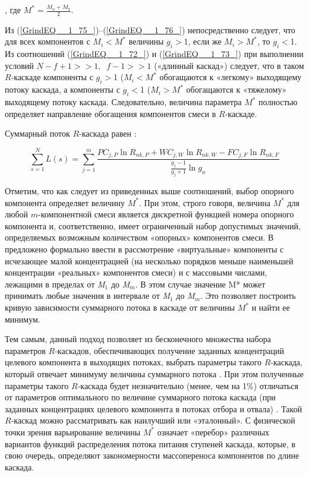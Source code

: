 , где $M^{*} =\frac{M_{n} +M_{k} }{2} $.

Из (\ref{GrindEQ__1_75_})--(\ref{GrindEQ__1_76_}) непосредственно следует, что для всех компонентов с $M_{i} $$\mathrm{<}$$M^{*} $ величины $g_{i} $$\mathrm{>}$1, если же $M_{i} $$\mathrm{>}$$M^{*} $, то $g_{i} $$\mathrm{<}$1. Из соотношений (\ref{GrindEQ__1_72_}) и (\ref{GrindEQ__1_73_}) при выполнении условий $N-f+1>>1,\; \; f-1>>1$ («длинный каскад») следует, что в таком $R$-каскаде компоненты с $g_{i} $$\mathrm{>}$1 ($M_{i} $$\mathrm{<}$$M^{*} $ обогащаются к «легкому» выходящему потоку каскада, а компоненты с $g_{i} $$\mathrm{<}$1 ($M_{i} $$\mathrm{>}$$M^{*}$ обогащаются к «тяжелому» выходящему потоку каскада. Следовательно, величина параметра $M^{*}$ полностью определяет направление обогащения компонентов смеси в $R$-каскаде. 

Суммарный поток $R$-каскада равен \cite{sulaberidzeTeoriyaKaskadovDlya2011}:

\begin{equation} \label{GrindEQ__1_77_} 
  \sum _{s=1}^{N}L(s) =\sum _{j=1}^{m}\frac{PC_{j,P} \ln R_{nk,P} +WC_{j,W} \ln R_{nk,W} -FC_{j,F} \ln R_{nk,F} }{\frac{g_{j} -1}{g_{j} +1} \ln g_{n} }              
\end{equation} 

Отметим, что как следует из приведенных выше соотношений, выбор опорного компонента определяет величину $M^{*}$. При этом, строго говоря, величина $M^{*}$ для любой $m$-компонентной смеси является дискретной функцией номера опорного компонента и, соответственно, имеет ограниченный набор допустимых значений, определяемых возможным количеством «опорных» компонентов смеси. В \cite{sulaberidzeSravnenieOptimalnyhModelnyh2008} предложено формально ввести в рассмотрение «виртуальные» компоненты с исчезающее малой концентрацией (на несколько порядков меньше наименьшей концентрации «реальных» компонентов смеси) и с массовыми числами, лежащими в пределах от \textit{M${}_{1}$} до \textit{M${}_{m}$}. В этом случае значение M* может принимать любые значения в интервале от \textit{M${}_{1}$} до \textit{M${}_{m}$}. Это позволяет построить кривую зависимости суммарного потока в каскаде от величины $M^{*}$ и найти ее минимум.

Тем самым, данный подход позволяет из бесконечного множества набора параметров $R$-каскадов, обеспечивающих получение заданных концентраций целевого компонента в выходящих потоках, выбрать параметры такого $R$-каскада, который отвечает минимуму величины суммарного потока \cite{sulaberidzeSravnenieOptimalnyhModelnyh2008}. При этом полученные параметры такого $R$-каскада будет незначительно (менее, чем на 1\%) отличаться от параметров оптимального по величине суммарного потока каскада (при заданных концентрациях целевого компонента в потоках отбора и отвала) \cite{songComparativeStudyModel2010}. Такой $R$-каскад можно рассматривать как наилучший или «эталонный». С физической точки зрения варьирование величины $M^{*}$ означает «перебор» различных вариантов функций распределения потока питания ступеней каскада, которые, в свою очередь, определяют закономерности массопереноса компонентов по длине каскада.


